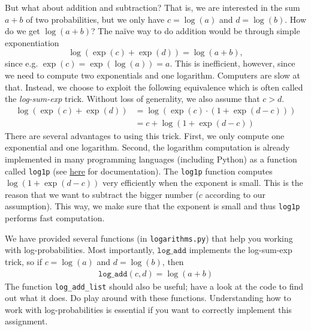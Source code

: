 \documentclass[11pt, a4paper]{article}
\begin{document}
But what about addition and subtraction?
That is, we are interested in the sum $a + b$ of two probabilities, but we only have $ c = \log(a) $ and $ d = \log(b) $.
How do we get $\log(a + b)$? 
The na\"ive way to do addition would be through simple exponentiation
\begin{equation*}
\log(\exp(c) + \exp(d)) = \log(a + b),
\end{equation*}
since e.g. $\exp(c) = \exp(\log(a)) = a$.
This is inefficient, however, since we need to compute two exponentials and one logarithm. Computers are slow at that. Instead, we choose to exploit the
following equivalence which is often called the \emph{log-sum-exp} trick. Without loss of generality, we also assume that $ c > d $.
\begin{align*}
\log(\exp(c) + \exp(d)) &= \log(\exp(c) \cdot (1 + \exp(d-c)))  \\
&= c + \log(1 + \exp(d-c)) 
\end{align*}
There are several advantages to using this trick. First, we only compute one exponential and one logarithm. Second, the logarithm computation is already 
implemented in many programming languages (including Python) as a function called \texttt{log1p} (see \href{https://docs.python.org/3/library/math.html}{here} for documentation). The \texttt{log1p} function computes $ \log(1 + \exp(d-c)) $ very efficiently when the exponent is small. This is the reason that we want to subtract
the bigger number ($ c $ according to our assumption). This way, we make sure that the exponent is small and thus \texttt{log1p} performs fast computation.



We have provided several functions (in \texttt{logarithms.py}) that help you working with log-probabilities.
Most importantly, $\texttt{log\_add}$ implements the log-sum-exp trick, so if $c = \log(a)$ and $d = \log(b)$, then
\begin{align}
  \texttt{log\_add}(c, d) 
    = \log( a + b )
\end{align}
The function \texttt{log\_add\_list} should also be useful; have a look at the code to find out what it does.
Do play around with these functions. 
Understanding how to work with log-probabilities is essential if you want to correctly implement this assignment.
\end{document}
